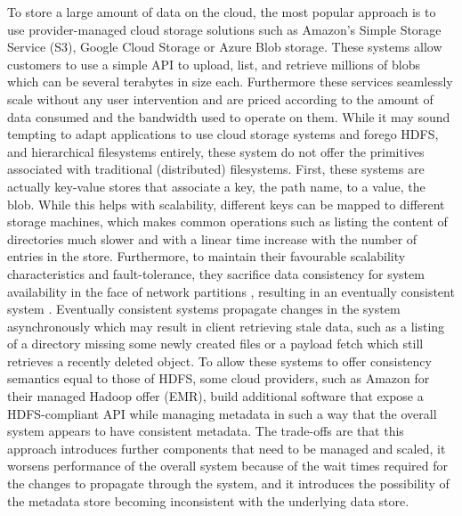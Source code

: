 To store a large amount of data on the cloud, the most popular approach is to use provider-managed cloud storage solutions such as Amazon's Simple Storage Service (S3), Google Cloud Storage or Azure Blob storage.
These systems allow customers to use a simple API to upload, list, and retrieve millions of blobs which can be several terabytes in size each.
Furthermore these services seamlessly scale without any user intervention and are priced according to the amount of data consumed and the bandwidth used to operate on them.
While it may sound tempting to adapt applications to use cloud storage systems and forego HDFS, and hierarchical filesystems entirely, these system do not offer the primitives associated with traditional (distributed) filesystems.
First, these systems are actually key-value stores that associate a key, the path name, to a value, the blob.
While this helps with scalability, different keys can be mapped to different storage machines, which makes common operations such as listing the content of directories much slower and with a linear time increase with the number of entries in the store. 
Furthermore, to maintain their favourable scalability characteristics and fault-tolerance, they sacrifice data consistency for system availability in the face of network partitions \cite{DBLP:conf/podc/Brewer00}, resulting in an eventually consistent system \cite{DBLP:journals/cacm/Vogels09}.
Eventually consistent systems propagate changes in the system asynchronously which may result in client retrieving stale data, such as a listing of a directory missing some newly created files or a payload fetch which still retrieves a recently deleted object.
To allow these systems to offer consistency semantics equal to those of HDFS, some cloud providers, such as Amazon for their managed Hadoop offer (EMR), build additional software that expose a HDFS-compliant API while managing metadata in such a way that the overall system appears to have consistent metadata.
The trade-offs are that this approach introduces further components that need to be managed and scaled, it worsens performance of the overall system because of the wait times required for the changes to propagate through the system, and it introduces the possibility of the metadata store becoming inconsistent with the underlying data store.

